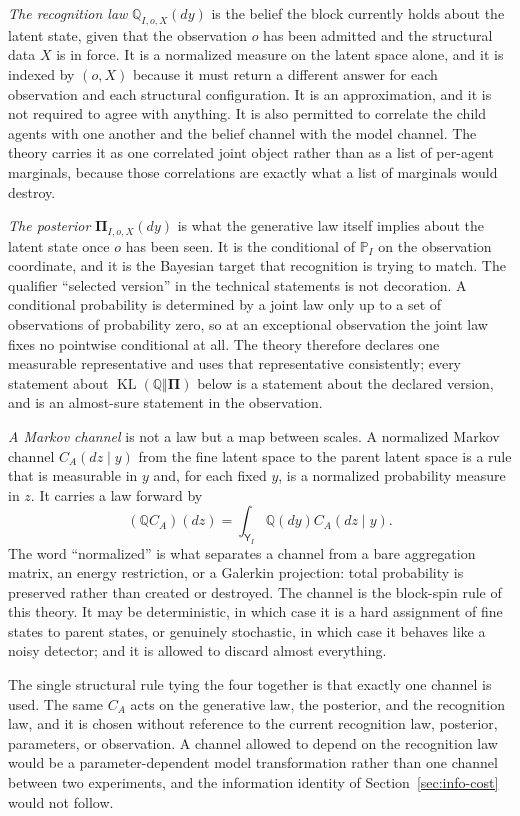 \documentclass[11pt,letterpaper]{article}
\newcommand{\KL}{\operatorname{KL}}
\newcommand{\Prob}{\mathbb P}
\newcommand{\Rec}{\mathbb Q}
\newcommand{\Post}{\boldsymbol\Pi}
\begin{document}
\textit{The recognition law} \(\Rec_{I,o,X}(dy)\) is the belief the block currently holds about the latent state, given that the observation \(o\) has been admitted and the structural data \(X\) is in force. It is a normalized measure on the latent space alone, and it is indexed by \((o,X)\) because it must return a different answer for each observation and each structural configuration. It is an approximation, and it is not required to agree with anything. It is also permitted to correlate the child agents with one another and the belief channel with the model channel. The theory carries it as one correlated joint object rather than as a list of per-agent marginals, because those correlations are exactly what a list of marginals would destroy.

\textit{The posterior} \(\Post_{I,o,X}(dy)\) is what the generative law itself implies about the latent state once \(o\) has been seen. It is the conditional of \(\Prob_I\) on the observation coordinate, and it is the Bayesian target that recognition is trying to match. The qualifier ``selected version'' in the technical statements is not decoration. A conditional probability is determined by a joint law only up to a set of observations of probability zero, so at an exceptional observation the joint law fixes no pointwise conditional at all. The theory therefore declares one measurable representative and uses that representative consistently; every statement about \(\KL(\Rec\Vert\Post)\) below is a statement about the declared version, and is an almost-sure statement in the observation.

\textit{A Markov channel} is not a law but a map between scales. A normalized Markov channel \(C_A(dz\mid y)\) from the fine latent space to the parent latent space is a rule that is measurable in \(y\) and, for each fixed \(y\), is a normalized probability measure in \(z\). It carries a law forward by
\[
  (\Rec C_A)(dz)=\int_{\mathsf Y_I}\Rec(dy)C_A(dz\mid y).
\]
The word ``normalized'' is what separates a channel from a bare aggregation matrix, an energy restriction, or a Galerkin projection: total probability is preserved rather than created or destroyed. The channel is the block-spin rule of this theory. It may be deterministic, in which case it is a hard assignment of fine states to parent states, or genuinely stochastic, in which case it behaves like a noisy detector; and it is allowed to discard almost everything.

The single structural rule tying the four together is that exactly one channel is used. The same \(C_A\) acts on the generative law, the posterior, and the recognition law, and it is chosen without reference to the current recognition law, posterior, parameters, or observation. A channel allowed to depend on the recognition law would be a parameter-dependent model transformation rather than one channel between two experiments, and the information identity of Section~\ref{sec:info-cost} would not follow.
\end{document}
